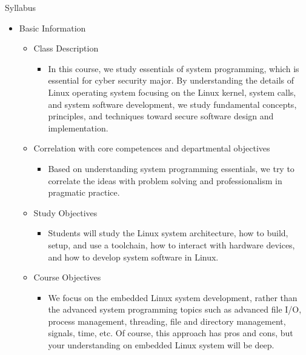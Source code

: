 \begin{frame}{Syllabus}
  \begin{itemize}
    \item Basic Information
    \begin{itemize}
    \item Class Description
      \begin{itemize}
        \item In this course, we study essentials of system programming, which is essential for cyber security major. By understanding the details of Linux operating system focusing on the Linux kernel, system calls, and system software development, we study fundamental concepts, principles, and techniques toward secure software design and implementation.
      \end{itemize}
    \item Correlation with core competences and departmental objectives
      \begin{itemize}
        \item Based on understanding system programming essentials, we try to correlate the ideas with problem solving and professionalism in pragmatic practice.
      \end{itemize} 
    \item Study Objectives
      \begin{itemize}
        \item Students will study the Linux system architecture, how to build, setup, and use a toolchain, how to interact with hardware devices, and how to develop system software in Linux.
      \end{itemize}
    \item Course Objectives
      \begin{itemize}
        \item We focus on the embedded Linux system development, rather than the advanced system programming topics such as advanced file I/O, process management, threading, file and directory management, signals, time, etc. Of course, this approach has pros and cons, but your understanding on embedded Linux system will be deep.
      \end{itemize}  
    \end{itemize}
  \end{itemize}
\end{frame}

